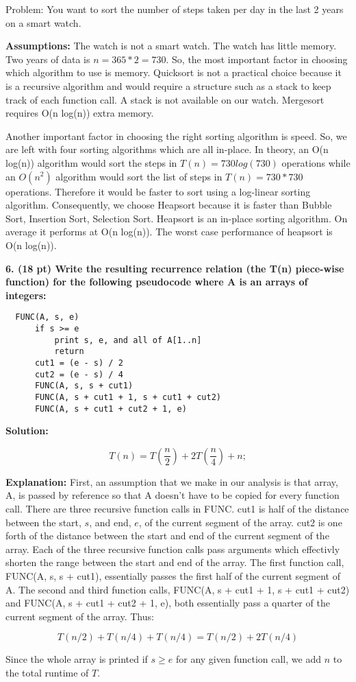 \documentclass[12pt, a4paper]{article}
\begin{document}
\begin{center}
  Problem: You want to sort the number of steps taken per day in the last 2 years on a smart
watch.
\end{center}

\textbf{Assumptions:} The watch is not a smart watch. The watch has little memory.  \\

Two years of data is $ n = 365 * 2 = 730 $.
So, the most important factor in choosing which algorithm to use is memory. 
Quicksort is not a practical choice because it is a recursive algorithm and would 
require a structure such as a stack to keep track of each function call. A stack is not available
on our watch.
Mergesort requires O(n log(n)) extra memory. 

Another important factor in choosing the right sorting algorithm is speed. 
So, we are left with four sorting algorithms which are all in-place.
In theory, an O(n log(n)) algorithm would sort the steps in $T(n) = 730 log(730) $ operations
while an $O(n^2)$ algorithm would sort the list of steps in $T(n) = 730 * 730 $ operations.
Therefore it would be faster to sort using a log-linear sorting algorithm. 
Consequently, we choose Heapsort because it is faster than Bubble Sort, Insertion Sort, Selection Sort.
Heapsort is an in-place sorting algorithm. On average it performs at O(n log(n)). The worst case 
performance of heapsort is O(n log(n)). 

\newpage
\textbf{6. (18 pt) Write the resulting recurrence relation (the T(n) piece-wise function) for the
following pseudocode where A is an arrays of integers: } \\

\begin{lstlisting}
  FUNC(A, s, e)
      if s >= e
          print s, e, and all of A[1..n]
          return
      cut1 = (e - s) / 2
      cut2 = (e - s) / 4
      FUNC(A, s, s + cut1)
      FUNC(A, s + cut1 + 1, s + cut1 + cut2)
      FUNC(A, s + cut1 + cut2 + 1, e)
\end{lstlisting} 

\textbf{Solution:}  

\[
  T(n) = T \left( \frac{n}{2} \right) + 2T \left( \frac{n}{4} \right) + n;
\]

\textbf{Explanation:} First, an assumption that we make in our analysis is that
array, A, is passed by reference so that A doesn't have to be copied 
for every function call. 
There are three recursive function calls in FUNC. 
cut1 is half of the distance between the start, $s$, and end, $e$, of the current segment 
of the array. cut2 is one forth of the distance between the start and end
of the current segment of the array.
Each of the three recursive function calls pass arguments which effectivly shorten the range 
between the start and end of the array.
The first function call, FUNC(A, s, s + cut1), essentially passes the first half of the current
segment of A.  
The second and third function calls, FUNC(A, s + cut1 + 1, s + cut1 + cut2) and 
FUNC(A, s + cut1 + cut2 + 1, e), both essentially pass a quarter of the current segment of 
the array.
Thus: 

\[ 
  T(n/2) + T(n/4) + T(n/4) = T(n/2) + 2T(n/4)
\]

Since the whole array is printed if $ s \geq e $ for any given function call, we add $ n $ to the total runtime 
of $T$.
\end{document}

